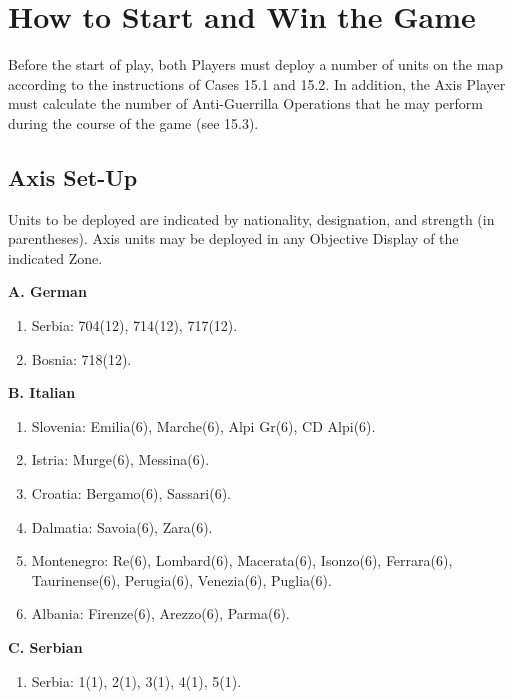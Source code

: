 \section{How to Start and Win the Game}\label{sec:15.0}

\begin{generalrule}
Before the start of play, both Players must deploy a number of units on the map
according to the instructions of Cases 15.1 and 15.2. In addition, the Axis
Player must calculate the number of Anti-Guerrilla Operations that he may
perform during the course of the game (see 15.3).
\end{generalrule}

\subsection{Axis Set-Up}\label{sec:15.1}

\noindent Units to be deployed are indicated by nationality, designation, and strength
(in parentheses). Axis units may be deployed in any Objective Display of the
indicated Zone.

\textbf{A. German}
  \begin{enumerate}[leftmargin=1.7em,labelsep=0.45em]
    \item Serbia: 704(12), 714(12), 717(12).
    \item Bosnia: 718(12).
  \end{enumerate}

\textbf{B. Italian}
  \begin{enumerate}[leftmargin=1.7em,labelsep=0.45em]
    \item Slovenia: Emilia(6), Marche(6), Alpi Gr(6), CD Alpi(6).
    \item Istria: Murge(6), Messina(6).
    \item Croatia: Bergamo(6), Sassari(6).
    \item Dalmatia: Savoia(6), Zara(6).
    \item Montenegro: Re(6), Lombard(6), Macerata(6), Isonzo(6), Ferrara(6),
      Taurinense(6), Perugia(6), Venezia(6), Puglia(6).
    \item Albania: Firenze(6), Arezzo(6), Parma(6).
  \end{enumerate}

\textbf{C. Serbian}
  \begin{enumerate}[leftmargin=1.7em,labelsep=0.45em]
    \item Serbia: 1(1), 2(1), 3(1), 4(1), 5(1).
  \end{enumerate}

